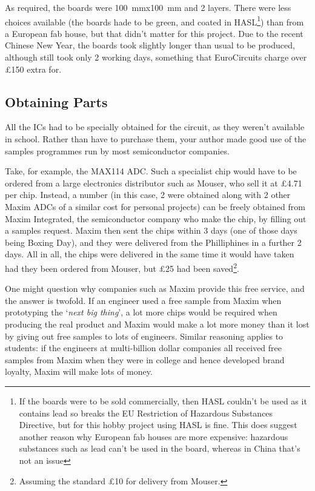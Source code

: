 As required, the boards were \SI{100}{mm}x\SI{100}{mm} and 2 layers. There were
less choices available (the boards hade to be green, and coated in
HASL\footnote{If the boards were to be sold commercially, then HASL couldn't be
  used as it contains lead so breaks the EU Restriction of Hazardous Substances
  Directive, but for this hobby project using HASL is fine. This does suggest
  another reason why European fab houses are more expensive: hazardous
  substances such as lead can't be used in the board, whereas in China that's
not an issue}) than from a European fab house, but that didn't matter for this
project. Due to the recent Chinese New Year, the boards took slightly longer
than usual to be produced, although still took only 2 working days, something
that EuroCircuits charge over \pounds 150 extra for.

\subsection{Obtaining Parts}

All the ICs had to be specially obtained for the circuit, as they weren't
available in school. Rather than have to purchase them, your author made good
use of the samples programmes run by most semiconductor companies.

Take, for example, the MAX114 ADC. Such a specialist chip would have to be
ordered from a large electronics distributor such as Mouser, who sell it at
\pounds 4.71 per chip. Instead, a number (in this case, 2 were obtained along
with 2 other Maxim ADCs of a similar cost for personal projects) can be freely
obtained from Maxim Integrated, the semiconductor company who make the chip, by
filling out a samples request. Maxim then sent the chips within 3 days (one of
those days being Boxing Day), and they were delivered from the Philliphines in a
further 2 days. All in all, the chips were delivered in the same time it would
have taken had they been ordered from Mouser, but \pounds 25 had been
saved\footnote{Assuming the standard \pounds 10 for delivery from Mouser.}.

One might question why companies such as Maxim provide this free service, and
the answer is twofold. If an engineer used a free sample from Maxim when
prototyping the `\textit{next big thing}', a lot more chips would be required
when producing the real product and Maxim would make a lot more money than it
lost by giving out free samples to lots of engineers. Similar reasoning applies
to students: if the engineers at multi-billion dollar companies all received
free samples from Maxim when they were in college and hence developed brand
loyalty, Maxim will make lots of money.

